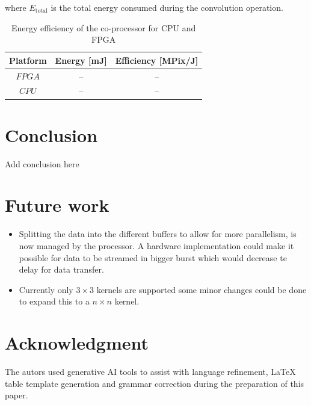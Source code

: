 \documentclass[conference]{IEEEtran}
\begin{document}
where $E_\text{total}$ is the total energy consumed during the convolution operation.

\begin{table}[H]
\centering
\caption{Energy efficiency of the co-processor for CPU and FPGA}
\begin{tabular}{c c c}
\hline
Platform & Energy [mJ] & Efficiency [MPix/J] \\
\hline
$FPGA$ & -- & -- \\
$CPU$ & -- & -- \\
\hline
\end{tabular}
\label{tab:energy-efficiency}
\end{table}



\section{Conclusion}
Add conclusion here



\section{Future work}

\begin{itemize}[noitemsep]
  \item Splitting the data into the different buffers to allow for more parallelism, is now managed by the processor. A hardware implementation could make it possible for data to be streamed in bigger burst which would decrease te delay for data transfer.
  \item Currently only $3\times3$ kernels are supported some minor changes could be done to expand this to a $n\times n $ kernel. 
\end{itemize}


\section*{Acknowledgment}
The autors used generative AI tools to assist with language refinement, LaTeX table template generation and grammar correction during the preparation of this paper.
\end{document}
